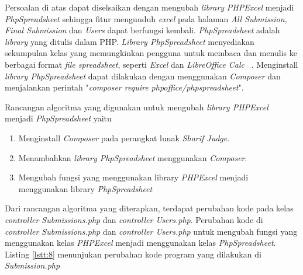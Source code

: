 	Persoalan di atas dapat diselsaikan dengan mengubah \textit{library} \textit{PHPExcel} menjadi \textit{PhpSpreadsheet} sehingga fitur mengunduh \textit{excel} pada halaman \textit{All Submission, Final Submission} dan \textit{Users} dapat berfungsi kembali. \textit{PhpSpreadsheet} adalah \textit{library} yang ditulis dalam PHP. \textit{Library PhpSpreadsheet} menyediakan sekumpulan kelas yang memungkinkan pengguna untuk membaca dan menulis ke berbagai format \textit{file spreadsheet}, seperti \textit{Excel} dan \textit{LibreOffice Calc} ~\cite{phpoffice:10:phpspreadsheet}. Menginstall \textit{library PhpSpreadsheet} dapat dilakukan dengan menggunakan \textit{Composer} dan menjalankan perintah "\textit{composer require phpoffice/phpspreadsheet}".
	
	Rancangan algoritma yang digunakan untuk mengubah \textit{library PHPExcel} menjadi \textit{PhpSpreadsheet} yaitu
	\begin{enumerate}
		\item Menginstall \textit{Composer} pada perangkat lunak \textit{Sharif Judge}.
		\item Menambahkan \textit{library PhpSpreadsheet} menggunakan \textit{Composer}.
		\item Mengubah fungsi yang menggunakan library \textit{PHPExcel} menjadi menggunakan library \textit{PhpSpreadsheet}
	\end{enumerate}
	
	Dari rancangan algoritma yang diterapkan, terdapat perubahan kode pada kelas \textit{controller Submissions.php} dan \textit{controller Users.php}. Perubahan kode di \textit{controller Submissions.php} dan \textit{controller Users.php} untuk mengubah fungsi yang menggunakan kelas \textit{PHPExcel} menjadi menggunakan kelas \textit{PhpSpreadsheet}. Listing \ref{lstt:8} menunjukan perubahan kode program yang dilakukan di \textit{Submission.php}
	

